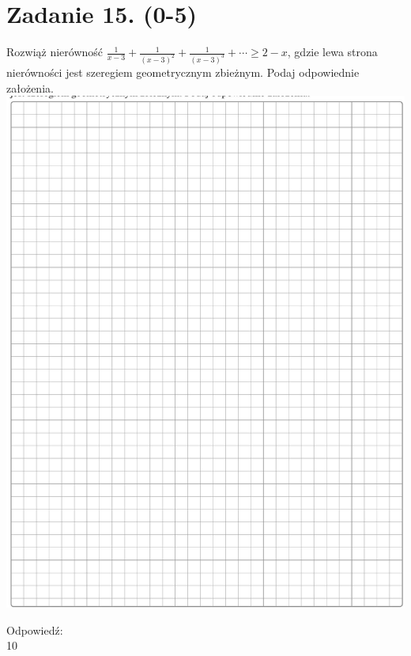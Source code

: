 \documentclass[10pt]{article}
\begin{document}
\section*{Zadanie 15. (0-5)}
Rozwiąż nierówność \(\frac{1}{x-3}+\frac{1}{(x-3)^{2}}+\frac{1}{(x-3)^{3}}+\cdots \geq 2-x\), gdzie lewa strona nierówności jest szeregiem geometrycznym zbieżnym. Podaj odpowiednie założenia.\\
\includegraphics[max width=\textwidth, center]{2024_11_21_d15133c79177ee6989d3g-10}

Odpowiedź: \(\qquad\)\\
10
\end{document}
